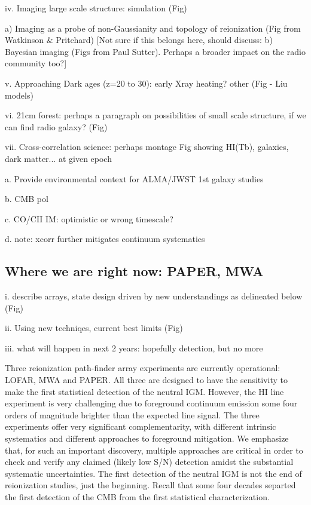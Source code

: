 \documentclass[preprint]{aastex}
\begin{document}
iv. Imaging large scale structure: simulation (Fig) 
    
a) Imaging as a probe of non-Gaussianity and topology of reionization (Fig from Watkinson & Pritchard)
[Not sure if this belongs here, should discuss: b) Bayesian imaging (Figs from Paul Sutter).  
Perhaps a broader impact on the radio community too?]

v. Approaching Dark ages (z=20 to 30): early Xray heating? other (Fig - Liu models)

vi. 21cm forest: perhaps a paragraph on possibilities of small scale structure, if we can find radio galaxy? (Fig) 

vii. Cross-correlation science: perhaps montage Fig showing HI(Tb), galaxies, dark matter... at given epoch

a. Provide environmental context for ALMA/JWST 1st galaxy studies

b. CMB pol 

c. CO/CII IM: optimistic or wrong timescale?
  
d. note: xcorr further mitigates continuum systematics

\subsection{Where we are right now: PAPER, MWA}  %

i. describe arrays, state design driven by new understandings as delineated below (Fig)

ii. Using new techniqes, current best limits  (Fig)

iii. what will happen in next 2 years: hopefully detection, but no more

Three reionization path-finder array experiments are currently
operational: LOFAR, MWA and PAPER. All three are designed to have the
sensitivity to make the first statistical detection of the neutral
IGM. However, the HI line experiment is very challenging due to
foreground continuum emission some four orders of magnitude brighter
than the expected line signal.  The three experiments offer very
significant complementarity, with different intrinsic systematics and
different approaches to foreground mitigation. We emphasize that, for
such an important discovery, multiple approaches are critical in order
to check and verify any claimed (likely low S/N) detection amidst the
substantial systematic uncertainties. The first detection of
the neutral IGM is not the end of reionization studies, just the 
beginning. Recall that some four decades separted the first detection
of the CMB from the first statistical characterization. 
\end{document}
